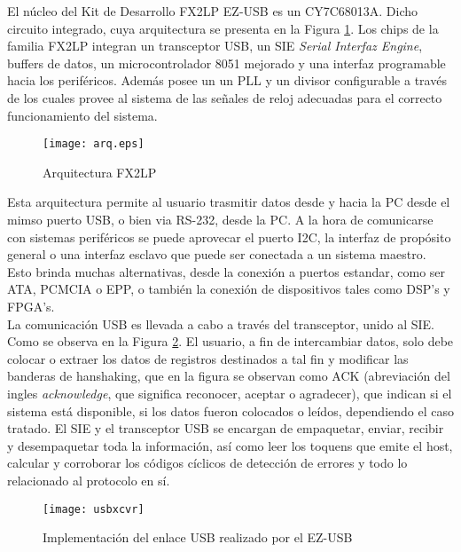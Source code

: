 	El núcleo del Kit de Desarrollo FX2LP EZ-USB es un CY7C68013A. Dicho circuito integrado, cuya arquitectura se presenta en la Figura \ref{arqEzUSB}. Los chips de la familia FX2LP integran un transceptor USB, un SIE {\it Serial Interfaz Engine}, buffers de datos, un microcontrolador 8051 mejorado y una interfaz programable hacia los periféricos. Además posee un un PLL y un divisor configurable a través de los cuales provee al sistema de las señales de reloj adecuadas para el correcto funcionamiento del sistema.\\
	
	\begin{figure}[b]
		\centering
		\texttt{[image: arq.eps]}
		\caption{Arquitectura FX2LP} 
		\label{arqEzUSB}
	\end{figure}

	Esta arquitectura permite al usuario trasmitir datos desde y hacia la PC desde el mimso puerto USB, o bien via RS-232, desde la PC. A la hora de comunicarse con sistemas periféricos se puede aprovecar el puerto I2C, la interfaz de propósito general o una interfaz esclavo que puede ser conectada a un sistema maestro. Esto brinda muchas alternativas, desde la conexión a puertos estandar, como ser ATA, PCMCIA o EPP, o también la conexión de dispositivos tales como DSP's y FPGA's.\\
	
	La comunicación USB es llevada a cabo a través del transceptor, unido al SIE. Como se observa en la Figura \ref{usbxcvr}. El usuario, a fin de intercambiar datos, solo debe colocar o extraer los datos de registros destinados a tal fin y modificar las banderas de hanshaking, que en la figura se observan como ACK (abreviación del ingles {\it acknowledge}, que significa reconocer, aceptar o agradecer), que indican si el sistema está disponible, si los datos fueron colocados o leídos, dependiendo el caso tratado. El SIE y el transceptor USB se encargan de empaquetar, enviar, recibir y desempaquetar toda la información, así como leer los toquens que emite el host, calcular y corroborar los códigos cíclicos de detección de errores y todo lo relacionado al protocolo en sí.\\
	
	\begin{figure}
		\centering
		\texttt{[image: usbxcvr]}
		\caption{Implementación del enlace USB realizado por el EZ-USB}
		\label{usbxcvr}
	\end{figure}
	
